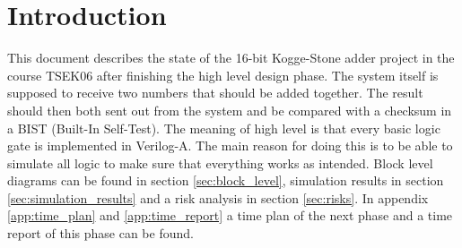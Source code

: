 \section{Introduction}
This document describes the state of the 16-bit Kogge-Stone adder project in the course TSEK06 after finishing the high level design phase. The system itself is supposed to receive two numbers that should be added together. The result should then both sent out from the system and be compared with a checksum in a BIST (Built-In Self-Test). The meaning of high level is that every basic logic gate is implemented in Verilog-A. The main reason for doing this is to be able to simulate all logic to make sure that everything works as intended. Block level diagrams can be found in section \ref{sec:block_level}, simulation results in section \ref{sec:simulation_results} and a risk analysis in section \ref{sec:risks}. In appendix \ref{app:time_plan} and \ref{app:time_report} a time plan of the next phase and a time report of this phase can be found.

